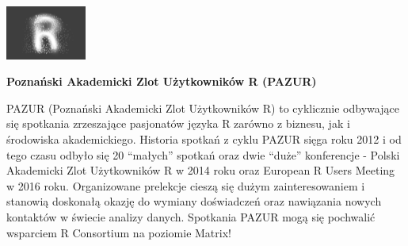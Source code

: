\documentclass[\main/boa.tex]{subfiles}
\begin{document}
	
	\begin{minipage}[t]{0.915\textwidth}
		\center     
		\includegraphics[width=100px]{img/logos.bw/pazur.png} 
	\end{minipage}
	\begin{center}
	\Large \textbf {Poznański Akademicki Zlot Użytkowników R (PAZUR)}
	\end{center}
	
	\vskip 0.3cm
	\normalsize 
	PAZUR (Poznański Akademicki Zlot Użytkowników R) to cyklicznie odbywające się spotkania zrzeszające pasjonatów języka R zarówno z biznesu, jak i środowiska akademickiego.
	Historia spotkań z cyklu PAZUR sięga roku 2012 i od tego czasu odbyło się 20 “małych” spotkań oraz dwie “duże” konferencje - Polski Akademicki Zlot Użytkowników R w 2014 roku oraz European R Users Meeting w 2016 roku. Organizowane prelekcje cieszą się dużym zainteresowaniem i stanowią doskonałą okazję do wymiany doświadczeń oraz nawiązania nowych kontaktów w świecie analizy danych. Spotkania PAZUR mogą się pochwalić wsparciem R Consortium na poziomie Matrix!
	
	\vskip 1.5cm
\end{document}
